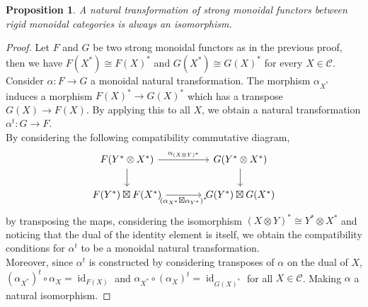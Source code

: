 \documentclass{article}
\theoremstyle{plain}
\newtheorem{theorem}{Theorem}[subsection]
\newtheorem{proposition}[theorem]{Proposition}
\theoremstyle{definition}
\DeclareMathOperator{\id}{id}
\begin{document}
\begin{proposition}
\label{rigid_monoidal_are_iso}
    A natural transformation of strong monoidal functors between rigid monoidal categories is always an isomorphism.
\end{proposition}
\begin{proof}
    Let $F$ and $G$ be two strong monoidal functors as in the previous proof, then we have $F(X^*)\cong F(X)^*$ and $G(X^*)\cong G(X)^*$ for every $X\in\mathcal{C}$.
    Consider $\alpha : F\rightarrow G$ a monoidal natural transformation.
    The morphism $\alpha_{X^*}$ induces a morphism $F(X)^*\rightarrow G(X)^*$ which has a transpose $G(X)\rightarrow F(X)$.
    By applying this to all $X$, we obtain a natural transformation $\alpha^t:G\rightarrow F$.\\
    By considering the following compatibility commutative diagram,
    \[
    \begin{tikzcd}[column sep = large]
        F(Y^*\otimes X^*)
        \arrow[r, "\alpha_{(X\otimes Y)^*}"]
        \arrow[d] &
        G(Y^*\otimes X^*)
        \arrow[d]\\
        F(Y^*)\boxtimes F(X^*)
        \arrow[r, "(\alpha_{X^*}\boxtimes\alpha_{Y^*})^*"'] &
        G(Y^*)\boxtimes G(X^*)
    \end{tikzcd}
    \]
    by transposing the maps, considering the isomorphism $(X\otimes Y)^*\cong Y^*\otimes X^*$ and noticing that the dual of the identity element is itself, we obtain the compatibility conditions for $\alpha^t$ to be a monoidal natural transformation.\\
    Moreover, since $\alpha^t$ is constructed by considering transposes of $\alpha$ on the dual of $X$, $(\alpha_{X^*})^t\circ \alpha_X = \id_{F(X)}$ and $\alpha_{X^*}\circ (\alpha_{X})^t = \id_{G(X)^*}$ for all $X\in\mathcal{C}$.
    Making $\alpha$ a natural isomorphism.
\end{proof}


\end{document}
